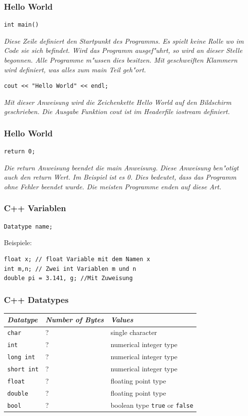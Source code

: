 \documentclass{beamer}
\begin{document}
\begin{frame}[fragile]
	\frametitle{Hello World}
	\begin{lstlisting}
int main()
	\end{lstlisting}
	\emph{Diese Zeile definiert den Startpunkt des Programms. Es spielt keine
	Rolle wo im Code sie sich befindet. Wird das Programm ausgef"uhrt, so
	wird an dieser Stelle begonnen. Alle Programme m"ussen dies
	besitzen. Mit geschweiften Klammern wird definiert, was alles zum main
	Teil geh"ort.}
	\vspace{3mm}
	\begin{lstlisting}
cout << "Hello World" << endl;
	\end{lstlisting}
	\emph{Mit dieser Anweisung wird die Zeichenkette Hello World auf den
	Bildschirm geschrieben. Die Ausgabe Funktion cout ist im
	Headerfile iostream definiert.}
\end{frame}

\begin{frame}[fragile]
	\frametitle{Hello World}
	\begin{lstlisting}
return 0;
	\end{lstlisting}
	\emph{Die return Anweisung beendet die main Anweisung. Diese Anweisung
	ben"otigt auch den return Wert. Im Beispiel ist es 0. Dies bedeutet,
	dass das Programm ohne Fehler beendet wurde. Die meisten Programme
	enden auf diese Art.}
\end{frame}

\begin{frame}[fragile]
	\frametitle{C++ Variablen}
	\begin{lstlisting}
Datatype name;
	\end{lstlisting}

	\vspace{3mm}

	Beispiele:
	\begin{lstlisting}
float x; // float Variable mit dem Namen x
int m,n; // Zwei int Variablen m und n
double pi = 3.141, g; //Mit Zuweisung
	\end{lstlisting}
\end{frame}

\begin{frame}[fragile]
	\frametitle{C++ Datatypes}
	\begin{tabular}{|l|l|l|}
	\hline
	\emph{Datatype} & \emph{Number of Bytes} & \emph{Values} \\
	\hline
	\verb|char| & ? & single character\\
	\verb|int| & ? & numerical integer type\\
	\verb|long int| & ? & numerical integer type\\
	\verb|short int| & ? & numerical integer type\\
	\verb|float| & ? & floating point type\\
	\verb|double| & ? & floating point type\\
	\verb|bool| & ? & boolean type \verb|true| or \verb|false|\\
	\hline
	\end{tabular}
\end{frame}
\end{document}
